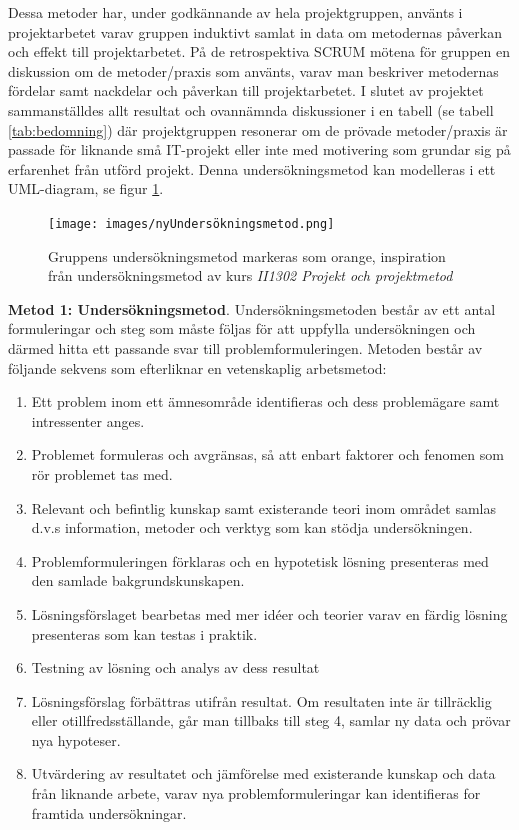 \documentclass[conference]{IEEEtran}
\begin{document}
Dessa metoder har, under godkännande av hela projektgruppen, använts i projektarbetet varav gruppen induktivt samlat in data om metodernas påverkan
och effekt till projektarbetet. På de retrospektiva SCRUM mötena för gruppen en diskussion om de metoder/praxis som använts, varav man beskriver metodernas 
fördelar samt nackdelar och påverkan till projektarbetet. I slutet av projektet sammanställdes allt resultat och ovannämnda diskussioner i en tabell 
(se tabell \ref{tab:bedomning}) där projektgruppen resonerar om de prövade metoder/praxis är passade för liknande små IT-projekt eller inte med motivering som grundar 
sig på erfarenhet från utförd projekt. Denna undersökningsmetod kan modelleras i ett UML-diagram, se figur \ref{fig:nyUndersökningsmetod}.

\begin{figure}[h!]
    \centerline{\texttt{[image: images/nyUndersökningsmetod.png]}}
    \caption{Gruppens undersökningsmetod markeras som orange, inspiration från undersökningsmetod av kurs \textit{II1302 Projekt och projektmetod}}
    \label{fig:nyUndersökningsmetod}
\end{figure}

\textbf{Metod 1: Undersökningsmetod}.
Undersökningsmetoden består av ett antal formuleringar och steg som måste följas
för att uppfylla undersökningen och därmed hitta ett passande svar till problemformuleringen. Metoden består av följande 
sekvens som efterliknar en vetenskaplig arbetsmetod:
\begin{enumerate}
 	\item Ett problem inom ett ämnesområde identifieras och dess problemägare samt intressenter anges.
	\item Problemet formuleras och avgränsas, så att enbart faktorer och fenomen som rör problemet tas med.
    \item Relevant och befintlig kunskap samt existerande teori inom området samlas d.v.s information, metoder och 
    verktyg som kan stödja undersökningen.
	\item Problemformuleringen förklaras och en hypotetisk lösning presenteras med den samlade bakgrundskunskapen.
	\item Lösningsförslaget bearbetas med mer idéer och teorier varav en färdig lösning presenteras som kan testas i praktik.
	\item Testning av lösning och analys av dess resultat
    \item Lösningsförslag förbättras utifrån resultat. Om resultaten inte är tillräcklig eller otillfredsställande, 
    går man tillbaks till steg 4, samlar ny data och prövar nya hypoteser.
	\item Utvärdering av resultatet och jämförelse med existerande kunskap och data från liknande arbete, varav nya problemformuleringar
	kan identifieras for framtida undersökningar.
\end{enumerate}
\end{document}
